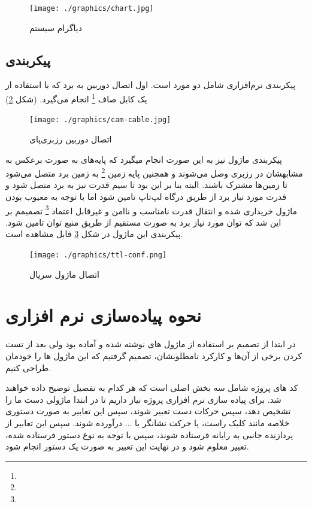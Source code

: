 \documentclass{article}
\begin{document}
\begin{figure}
	\centering
	\texttt{[image: ./graphics/chart.jpg]}
	\caption{دیاگرام سیستم}
	\label{chart}
\end{figure}


\subsection{پیکربندی}
پیکربندی نرم‌افزاری شامل دو مورد است. اول اتصال دوربین به برد که با استفاده از یک کابل صاف
\footnote{} انجام می‌گیرد.  (شکل \ref{cam-cable})

\begin{figure}
	\centering
	\texttt{[image: ./graphics/cam-cable.jpg]}
	\caption{اتصال دوربین رزبری‌پای}
	\label{cam-cable}
\end{figure}

پیکربندی ماژول  نیز به این صورت انجام میگیرد که پایه‌های  به صورت برعکس به مشابهشان در رزبری وصل می‌شوند و همچنین پایه‌ زمین \footnote{} به زمین برد
متصل می‌شود تا زمین‌ها مشترک باشند. البته بنا بر این بود تا سیم قدرت نیز به برد متصل شود و
قدرت مورد نیاز برد از طریق درگاه  لپ‌تاپ تامین شود اما با توجه به معیوب بودن ماژول
خریداری شده و انتقال قدرت نامناسب و ناامن و غیرقابل اعتماد \footnote{}
تصمیمم بر این شد که توان مورد نیاز برد به صورت مستقیم از طریق منبع توان تامین شود.
پیکربندی این ماژول در شکل \ref{ttl-conf} قابل مشاهده است.

\begin{figure}
	\centering
	\texttt{[image: ./graphics/ttl-conf.png]}
	\caption{اتصال ماژول سریال}
	\label{ttl-conf}
\end{figure}

\section{نحوه پیاده‌سازی نرم افزاری}
در ابتدا از تصمیم بر استفاده از ماژول های نوشته شده و آماده بود ولی بعد از تست کردن برخی از آن‌ها و کارکرد نامطلوبشان، تصمیم گرفتیم که این ماژول ها را خودمان طراحی کنیم.
 
کد های پروژه شامل سه بخش اصلی است که هر کدام به تفصیل توضیح داده خواهند شد. برای پیاده سازی نرم افزاری پروژه نیاز داریم تا در ابتدا ماژولی دست ما را تشخیص دهد، سپس حرکات دست تعبیر شوند، سپس این تعابیر به صورت دستوری خلاصه مانند کلیک راست، یا حرکت نشانگر یا ... درآورده شوند. سپس این تعابیر از پردازنده جانبی به رایانه فرستاده شوند، سپس با توجه به نوع دستور فرستاده شده، تعبیر   معلوم شود و در نهایت این تعبیر به صورت یک دستور  انجام شود.
\end{document}
